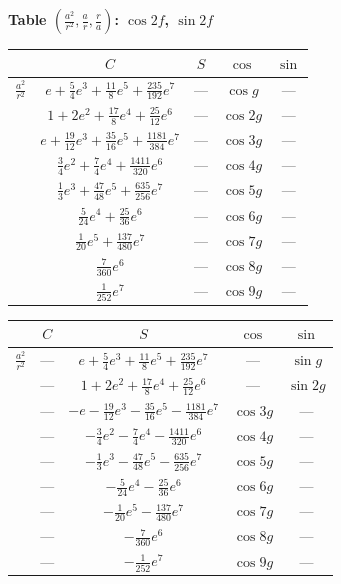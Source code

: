 \documentclass[11pt,a4paper]{book}
\begin{document}
{{\vspace{1em}

\noindent\textbf{Table $(\frac{a^2}{r^2}, \frac{a}{r}, \frac{r}{a})$: $\cos 2f$, $\sin 2f$}

\vspace{0.5em}

\begin{center}
\begin{tabular}{|c|c|c|c|c|}
\hline
& $C$ & $S$ & $\cos$ & $\sin$ \\
\hline
$\frac{a^2}{r^2}$ & $e + \frac{5}{4}e^3 + \frac{11}{8}e^5 + \frac{235}{192}e^7$ & --- & $\cos g$ & --- \\
& $1 + 2e^2 + \frac{17}{8}e^4 + \frac{25}{12}e^6$ & --- & $\cos 2g$ & --- \\
& $e + \frac{19}{12}e^3 + \frac{35}{16}e^5 + \frac{1181}{384}e^7$ & --- & $\cos 3g$ & --- \\
& $\frac{3}{4}e^2 + \frac{7}{4}e^4 + \frac{1411}{320}e^6$ & --- & $\cos 4g$ & --- \\
& $\frac{1}{3}e^3 + \frac{47}{48}e^5 + \frac{635}{256}e^7$ & --- & $\cos 5g$ & --- \\
& $\frac{5}{24}e^4 + \frac{25}{36}e^6$ & --- & $\cos 6g$ & --- \\
& $\frac{1}{20}e^5 + \frac{137}{480}e^7$ & --- & $\cos 7g$ & --- \\
& $\frac{7}{360}e^6$ & --- & $\cos 8g$ & --- \\
& $\frac{1}{252}e^7$ & --- & $\cos 9g$ & --- \\
\hline
\end{tabular}
\end{center}

\vspace{1em}

\begin{center}
\begin{tabular}{|c|c|c|c|c|}
\hline
& $C$ & $S$ & $\cos$ & $\sin$ \\
\hline
$\frac{a^2}{r^2}$ & --- & $e + \frac{5}{4}e^3 + \frac{11}{8}e^5 + \frac{235}{192}e^7$ & --- & $\sin g$ \\
& --- & $1 + 2e^2 + \frac{17}{8}e^4 + \frac{25}{12}e^6$ & --- & $\sin 2g$ \\
& --- & $-e - \frac{19}{12}e^3 - \frac{35}{16}e^5 - \frac{1181}{384}e^7$ & $\cos 3g$ & --- \\
& --- & $- \frac{3}{4}e^2 - \frac{7}{4}e^4 - \frac{1411}{320}e^6$ & $\cos 4g$ & --- \\
& --- & $- \frac{1}{3}e^3 - \frac{47}{48}e^5 - \frac{635}{256}e^7$ & $\cos 5g$ & --- \\
& --- & $- \frac{5}{24}e^4 - \frac{25}{36}e^6$ & $\cos 6g$ & --- \\
& --- & $- \frac{1}{20}e^5 - \frac{137}{480}e^7$ & $\cos 7g$ & --- \\
& --- & $- \frac{7}{360}e^6$ & $\cos 8g$ & --- \\
& --- & $- \frac{1}{252}e^7$ & $\cos 9g$ & --- \\
\hline
\end{tabular}
\end{center}

}}
\end{document}
